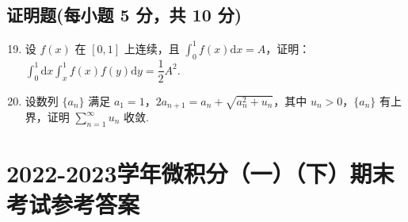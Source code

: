 \documentclass[../Main.tex]{subfiles}
\begin{document}
\section{证明题(每小题 5 分，共 10 分)}

\begin{enumerate}
  \setcounter{enumi}{18}
  \item 设 \( f(x) \) 在 \([0,1]\) 上连续，且 \( \displaystyle \int_0^1 f(x) \mathrm{d}x = A \)，证明：\( \displaystyle \int_0^1 \mathrm{d}x \displaystyle \int_x^1 f(x)f(y) \mathrm{d}y = \dfrac{1}{2}A^2 \).
        \vspace{11em}

  \item 设数列 \( \{a_n\} \) 满足 \( a_1 = 1 \)，\( 2a_{n+1} = a_n + \sqrt{a_n^2 + u_n} \)，其中 \( u_n > 0 \)，\( \{a_n\} \) 有上界，证明 \( \sum \limits_{n=1}^{\infty} u_n \) 收敛.
        \vspace{11em}
\end{enumerate}
\chapter{2022-2023学年微积分（一）（下）期末考试参考答案}
\end{document}

